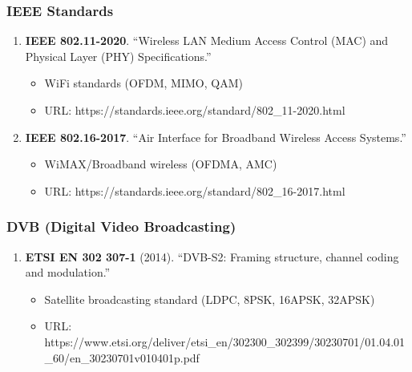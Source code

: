 \subsubsection{IEEE Standards}\label{ieee-standards}

\begin{enumerate}
\def\labelenumi{\arabic{enumi}.}
\setcounter{enumi}{30}
\tightlist
\item
  \textbf{IEEE 802.11-2020}. ``Wireless LAN Medium Access Control (MAC)
  and Physical Layer (PHY) Specifications.''

  \begin{itemize}
  \tightlist
  \item
    WiFi standards (OFDM, MIMO, QAM)
  \item
    URL: https://standards.ieee.org/standard/802\_11-2020.html
  \end{itemize}
\item
  \textbf{IEEE 802.16-2017}. ``Air Interface for Broadband Wireless
  Access Systems.''

  \begin{itemize}
  \tightlist
  \item
    WiMAX/Broadband wireless (OFDMA, AMC)
  \item
    URL: https://standards.ieee.org/standard/802\_16-2017.html
  \end{itemize}
\end{enumerate}

\subsubsection{DVB (Digital Video
Broadcasting)}\label{dvb-digital-video-broadcasting}

\begin{enumerate}
\def\labelenumi{\arabic{enumi}.}
\setcounter{enumi}{32}
\tightlist
\item
  \textbf{ETSI EN 302 307-1} (2014). ``DVB-S2: Framing structure,
  channel coding and modulation.''

  \begin{itemize}
  \tightlist
  \item
    Satellite broadcasting standard (LDPC, 8PSK, 16APSK, 32APSK)
  \item
    URL:
    https://www.etsi.org/deliver/etsi\_en/302300\_302399/30230701/01.04.01\_60/en\_30230701v010401p.pdf
  \end{itemize}
\end{enumerate}


